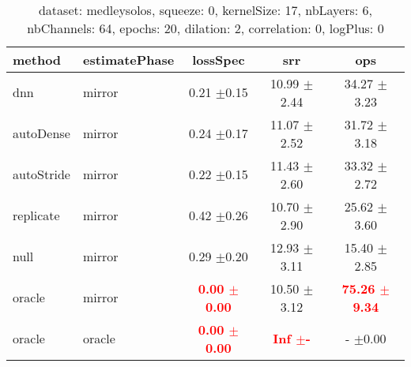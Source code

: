   
\begin{table} 
\begin{center} 
\ 
 \setlength{\tabcolsep}{.16667em} 
\begin{tabular}{llccc} 
method & estimatePhase & lossSpec & srr & ops \\ 
\hline 
dnn & mirror & 0.21 $\pm$0.15 & 10.99 $\pm$2.44 & 34.27 $\pm$3.23 \\ 
autoDense & mirror & 0.24 $\pm$0.17 & 11.07 $\pm$2.52 & 31.72 $\pm$3.18 \\ 
autoStride & mirror & 0.22 $\pm$0.15 & 11.43 $\pm$2.60 & 33.32 $\pm$2.72 \\ 
replicate & mirror & 0.42 $\pm$0.26 & 10.70 $\pm$2.90 & 25.62 $\pm$3.60 \\ 
null & mirror & 0.29 $\pm$0.20 & 12.93 $\pm$3.11 & 15.40 $\pm$2.85 \\ 
oracle & mirror & \textbf{\textcolor{red}{0.00 $\pm$0.00}} & 10.50 $\pm$3.12 & \textbf{\textcolor{red}{75.26 $\pm$9.34}} \\ 
oracle & oracle & \textbf{\textcolor{red}{0.00 $\pm$0.00}} & \textbf{\textcolor{red}{   Inf $\pm$-}} &   - $\pm$0.00 \\ 
\end{tabular} 
\end{center} 
\caption{dataset: medleysolos, squeeze: 0, kernelSize: 17, nbLayers: 6, nbChannels: 64, epochs: 20, dilation: 2, correlation: 0, logPlus: 0} 
\label{dameSq0Kesi17Nbla6Nbch64Ep20Di2Co0Lopl0} 
\end{table} 
 
